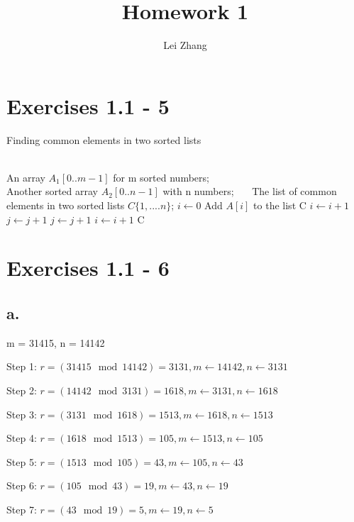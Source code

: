 \documentclass{article}
\title{Homework 1}
\author{Lei Zhang}
\begin{document}
\maketitle

\section{Exercises 1.1 - 5}

\begin{algorithm}
\caption{Finding common elements in two sorted lists}
\begin{algorithmic}[1]
\INPUT\\
An array $A_1[0..m-1]$ for m sorted numbers;\\
Another sorted array $A_2[0..n-1]$ with n numbers;
\OUTPUT ~~\
The list of common elements in two sorted lists $C\{1,....n\}$;
\State $ i \leftarrow 0 $
\State Add $A[i]$ to the list C
\State $i \leftarrow i + 1$
\State $j \leftarrow j + 1$
\State $j \leftarrow j + 1$
\Else
\State $i \leftarrow i +1$
\EndIf
\EndWhile
\State \Return C
\end{algorithmic}
\end{algorithm}

\section{Exercises 1.1 - 6}

\subsection*{a.}

m = 31415, n = 14142

Step 1: $r = (31415 \mod 14142) = 3131, m \leftarrow 14142, n \leftarrow 3131 $

Step 2: $r = (14142 \mod 3131) = 1618, m \leftarrow 3131, n \leftarrow 1618 $

Step 3: $r = (3131 \mod 1618) = 1513, m \leftarrow 1618, n \leftarrow 1513 $

Step 4: $r = (1618 \mod 1513) = 105, m \leftarrow 1513, n \leftarrow 105 $

Step 5: $r = (1513 \mod 105)= 43, m \leftarrow 105, n \leftarrow 43 $

Step 6: $r = (105 \mod 43) = 19, m \leftarrow 43, n \leftarrow 19 $

Step 7: $r = (43 \mod 19) = 5, m \leftarrow 19, n \leftarrow 5 $
\end{document}
